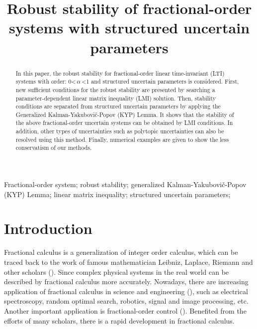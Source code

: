 \documentclass[]{interact}
\theoremstyle{plain}%
\theoremstyle{definition}
\theoremstyle{remark}
\begin{document}

\title{Robust stability of fractional-order systems with structured uncertain parameters}

\author{
}

\maketitle

\begin{abstract}
\sloppy{}
In this paper, the robust stability for fractional-order linear time-invariant (LTI) systems with order: 0\textless\,$\alpha$\,\textless1 and structured uncertain parameters is considered. First, new sufficient conditions for the robust stability are presented by searching a parameter-dependent linear matrix inequality (LMI) solution. Then, stability conditions are separated from structured uncertain parameters by applying the Generalized Kalman-Yakubovi\v{c}-Popov (KYP) Lemma. It shows that the stability of the above fractional-order uncertain systems can be obtained by LMI conditions. In addition, other types of uncertainties such as polytopic uncertainties can also be resolved using this method. Finally, numerical examples are given to show the less conservatism of our methods. 
\end{abstract}


\begin{keywords}
	Fractional-order system; robust stability; generalized Kalman-Yakubovi\v{c}-Popov (KYP) Lemma; linear matrix inequality; structured uncertain parameters;
\end{keywords}
\section{Introduction}

\par Fractional calculus is a generalization of integer order calculus, which can be traced back to the work of famous mathematician Leibniz, Laplace, Riemann and other scholars (\citealp{Pod1998}). Since complex physical systems in the real world can be described by fractional calculus more accurately. Nowadays, there are increasing application of fractional calculus in science and engineering (\citealp{Vic2015, Sun2018}), such as electrical spectroscopy, random optimal search, robotics, signal and image processing, etc. Another important application is fractional-order control (\citealp{Azar2017,Azarmi2020, Bes2017, LiZ2017}). Benefited from the efforts of many scholars, there is a rapid development in fractional calculus.
\end{document}
